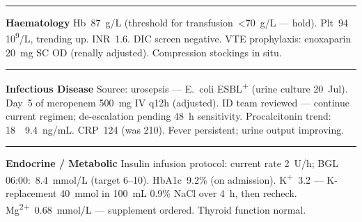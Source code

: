 \documentclass[11pt,a4paper]{scrartcl}
\newcommand{\organ}[2]{%
  \noindent
  {\color{MedTeal}\rule{3pt}{9pt}}\enspace
  {\sffamily\bfseries\small\color{MedNavy}#1}\enspace
  {\small\color{TextGray}#2}\par\vspace{1pt}%
}
\begin{document}
\begin{tcolorbox}[sectionbox,
  title={\faBrain\enspace Organ Systems Review — 24 July 2026}]
\begin{minipage}[t]{0.47\linewidth}
    \vspace{4pt}

    \organ{Haematology}{Hb~87~g/L (threshold for transfusion~\textless{}70~g/L
      — hold). Plt~94\,\texttimes{}\,10\textsuperscript{9}/L, trending up.
      INR~1.6. DIC screen negative. VTE prophylaxis: enoxaparin 20~mg SC OD
      (renally adjusted). Compression stockings in situ.}

    \vspace{4pt}

    \organ{Infectious Disease}{Source: urosepsis — E.~coli ESBL\textsuperscript{+}
      (urine culture 20~Jul). Day~5 of meropenem 500~mg IV q12h (adjusted).
      ID team reviewed — continue current regimen; de-escalation pending
      48~h sensitivity. Procalcitonin trend: 18~\textrightarrow{}~9.4~ng/mL.
      CRP~124 (was 210). Fever persistent; urine output improving.}

    \vspace{4pt}

    \organ{Endocrine / Metabolic}{Insulin infusion protocol: current rate
      2~U/h; BGL 06:00:~8.4~mmol/L (target 6--10). HbA1c~9.2\% (on
      admission). K\textsuperscript{+}~3.2 — K-replacement 40~mmol in 100~mL
      0.9\% NaCl over 4~h, then recheck. Mg\textsuperscript{2+}~0.68~mmol/L —
      supplement ordered. Thyroid function normal.}

  \end{minipage}

\end{tcolorbox}

\newpage


\vspace{4pt}
\end{document}
